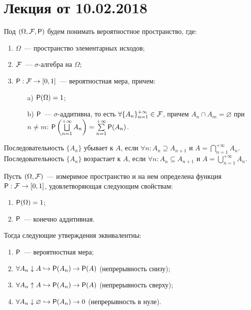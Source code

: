 \section{Лекция от 10.02.2018}
\begin{definition}
    Под $(\Omega, \F, \P)$ будем понимать вероятностное пространство, где:
    \begin{enumerate}
    	\item $\Omega$~--- пространство элементарных исходов;
    	\item $\F$~--- $\sigma$-алгебра на $\Omega$;
    	\item{$\P: \F \rightarrow [0, 1]$~--- вероятностная мера, причем:
    		\begin{enumerate}
    			\item[a)] $\P (\Omega) = 1$;
    			\item[b)] $\P$~--- $\sigma$-аддитивна, то есть $\forall \{A_n\}_{n = 1}^{+\infty} \in \F$, причем $A_n \cap A_m = \varnothing$ при $n \neq m$: $\P \left( \bigsqcup\limits_{n=1}^{+\infty} A_n \right) = \sum \limits_{n = 1}^{+\infty} \P (A_n)$.
    		\end{enumerate}
    	}
    \end{enumerate}
\end{definition}

\begin{definition}
	Последовательность $\{A_n\}$ убывает к $A$, если $\forall n: A_{n} \supseteq A_{n+1}$ и   $A = \bigcap\limits_{n = 1}^{+\infty} A_n$.
	Последовательность $\{A_n\}$ возрастает к $A$, если $\forall n: A_{n} \subseteq A_{n+1}$ и   $A = \bigcup\limits_{n = 1}^{+\infty} A_n$.
\end{definition}

\begin{theorem}
	Пусть $(\Omega, \F )$~--- измеримое пространство и на нем определена функция $\P: \F \rightarrow [0,1]$, удовлетворяющая следующим свойствам: 
	\begin{enumerate}
	    \item $\P (\Omega) = 1$;
	    \item  $\P$~--- конечно аддитивная.
	\end{enumerate} 
	Тогда следующие утверждения эквивалентны:
	\begin{enumerate}
		\item $\P$~--- вероятностная мера;
		\item $\forall A_n \downarrow A \hookrightarrow \P (A_n) \rightarrow \P(A)$ (непрерывность снизу);
		\item $\forall A_n \uparrow A \hookrightarrow \P (A_n) \rightarrow \P(A)$ (непрерывность сверху);
		\item  $\forall A_n \downarrow \varnothing \hookrightarrow \P (A_n) \rightarrow 0$ (непрерывность в нуле).
	\end{enumerate}
\end{theorem}

